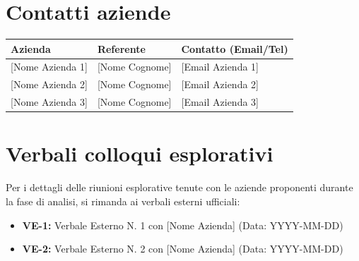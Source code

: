 \appendix

\section{Contatti aziende}
\begin{table}[ht]
	\centering
	\renewcommand{\arraystretch}{1.3}
	\begin{tabularx}{\textwidth}{l X l}
		\toprule
		\textbf{Azienda} & \textbf{Referente} & \textbf{Contatto (Email/Tel)} \\
		\midrule
		{[Nome Azienda 1]} & {[Nome Cognome]} & {[Email Azienda 1]} \\
		{[Nome Azienda 2]} & {[Nome Cognome]} & {[Email Azienda 2]} \\
		{[Nome Azienda 3]} & {[Nome Cognome]} & {[Email Azienda 3]} \\
		\bottomrule
	\end{tabularx}
\end{table}

\section{Verbali colloqui esplorativi}
Per i dettagli delle riunioni esplorative tenute con le aziende proponenti durante la fase di analisi, si rimanda ai verbali esterni ufficiali:
\begin{itemize}
	\item \textbf{VE-1:} Verbale Esterno N. 1 con {[Nome Azienda]} (Data: YYYY-MM-DD)
	\item \textbf{VE-2:} Verbale Esterno N. 2 con {[Nome Azienda]} (Data: YYYY-MM-DD)
\end{itemize}